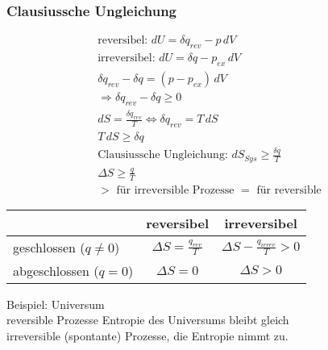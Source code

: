 \documentclass[a4paper, fleqn]{article}
\begin{document}
\subsubsection{Clausiussche Ungleichung}
\begin{eqnarray*}
    \text{reversibel: } dU = \delta q_{rev} - p\,dV\\
    \text{irreversibel: } dU = \delta q - p_{ex}\,dV\\
    \delta q_{rev} - \delta q = (p-p_{ex})\,dV\\
    \Rightarrow \delta q_{rev} - \delta q \geqslant 0\\
    dS = \frac{\delta q_{rev}}{T} \Leftrightarrow \delta q_{rev} = T\,dS\\
    T\,dS \geqslant \delta q\\
    \text{Clausiussche Ungleichung: } dS_{Sys} \geqslant \frac{\delta q}{T}\\
    \Delta S \geqslant \frac{q}{T}\\
    > \text{ für irreversible Prozesse } = \text{ für reversible}
\end{eqnarray*}

\begin{center}
    \begin{tabular}{l c c}
        \hline
        \rule{0pt}{15pt}&reversibel&irreversibel\\
        \hline
        \rule{0pt}{15pt}geschlossen ($q\neq 0$)&$\Delta S = \frac{q_{rev}}{T}$&$\Delta S-\frac{q_{irrev}}{T} > 0$\\
        \rule{0pt}{15pt}abgeschlossen ($q=0$)&$\Delta S = 0$& $\Delta S > 0$\\
    \end{tabular}
\end{center}
Beispiel: Universum\\
reversible Prozesse Entropie des Universums bleibt gleich\\
irreversible (spontante) Prozesse, die Entropie nimmt zu.\\
\end{document}
